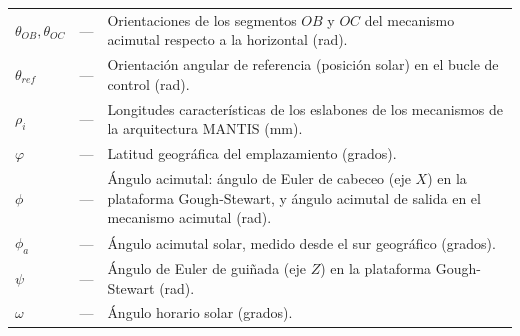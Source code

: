 \begin{longtable}{lcp{} }
$\theta_{OB},\theta_{OC}$ & --- & Orientaciones de los segmentos $OB$ y $OC$ del mecanismo acimutal respecto a la horizontal (rad).\\
$\theta_{ref}$ & --- & Orientación angular de referencia (posición solar) en el bucle de control (rad).\\
$\rho_i$   & --- & Longitudes características de los eslabones de los mecanismos de la arquitectura MANTIS (mm).\\
$\varphi$  & --- & Latitud geográfica del emplazamiento (grados).\\
$\phi$     & --- & Ángulo acimutal: ángulo de Euler de cabeceo (eje $X$) en la plataforma Gough-Stewart, y ángulo acimutal de salida en el mecanismo acimutal (rad).\\
$\phi_a$   & --- & Ángulo acimutal solar, medido desde el sur geográfico (grados).\\
$\psi$     & --- & Ángulo de Euler de guiñada (eje $Z$) en la plataforma Gough-Stewart (rad).\\
$\omega$   & --- & Ángulo horario solar (grados).\\
\end{longtable}